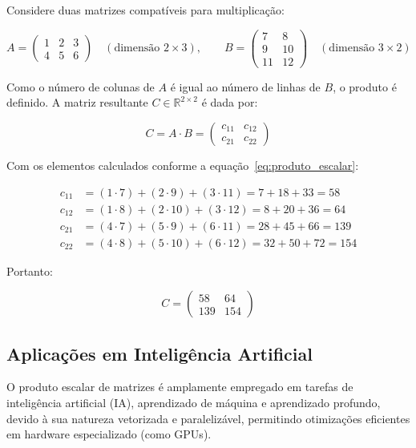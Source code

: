 \documentclass[11pt,a4paper]{article}
\begin{document}
Considere duas matrizes compatíveis para multiplicação:

\[
	A = \begin{pmatrix}
		1 & 2 & 3 \\
		4 & 5 & 6
	\end{pmatrix}
	\quad (\text{dimensão } 2 \times 3), \qquad
	B = \begin{pmatrix}
		7  & 8  \\
		9  & 10 \\
		11 & 12
	\end{pmatrix}
	\quad (\text{dimensão } 3 \times 2)
\]

Como o número de colunas de \( A \) é igual ao número de linhas de \( B \), o produto é definido. A matriz resultante \( C \in \mathbb{R}^{2 \times 2} \) é dada por:

\[
	C = A \cdot B =
	\begin{pmatrix}
		c_{11} & c_{12} \\
		c_{21} & c_{22}
	\end{pmatrix}
\]

Com os elementos calculados conforme a equação~\eqref{eq:produto_escalar}:

\[
	\begin{aligned}
		c_{11} & = (1 \cdot 7) + (2 \cdot 9) + (3 \cdot 11) = 7 + 18 + 33 = 58    \\
		c_{12} & = (1 \cdot 8) + (2 \cdot 10) + (3 \cdot 12) = 8 + 20 + 36 = 64   \\
		c_{21} & = (4 \cdot 7) + (5 \cdot 9) + (6 \cdot 11) = 28 + 45 + 66 = 139  \\
		c_{22} & = (4 \cdot 8) + (5 \cdot 10) + (6 \cdot 12) = 32 + 50 + 72 = 154
	\end{aligned}
\]

Portanto:

\[
	C = \begin{pmatrix}
		58  & 64  \\
		139 & 154
	\end{pmatrix}
\]

\subsection{Aplicações em Inteligência Artificial}

O produto escalar de matrizes é amplamente empregado em tarefas de inteligência artificial (IA), aprendizado de máquina e aprendizado profundo, devido à sua natureza vetorizada e paralelizável, permitindo otimizações eficientes em hardware especializado (como GPUs).
\end{document}
